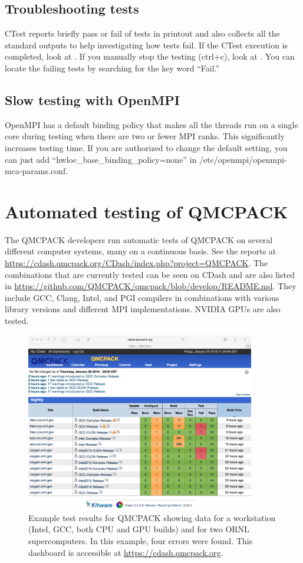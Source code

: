 \subsection{Troubleshooting tests}
CTest reports briefly pass or fail of tests in printout and also collects all the standard outputs to help investigating how tests fail.
If the CTest execution is completed, look at .
If you manually stop the testing (ctrl+c), look at .
You can locate the failing tests by searching for the key word ``Fail.''

\subsection{Slow testing with OpenMPI}
OpenMPI has a default binding policy that makes all the threads run on a single core during testing when there are two or fewer MPI ranks.
This significantly increases testing time. If you are authorized to change the default setting, you can just add ``hwloc\_base\_binding\_policy=none'' in /etc/openmpi/openmpi-mca-params.conf.

\section{Automated testing of QMCPACK}

The QMCPACK developers run automatic tests of QMCPACK on several
different computer systems,  many on a continuous basis. See the reports at
\url{https://cdash.qmcpack.org/CDash/index.php?project=QMCPACK}.
The combinations that are currently tested can be seen on CDash and are also listed in
\url{https://github.com/QMCPACK/qmcpack/blob/develop/README.md}. They include GCC, Clang, Intel, and PGI compilers in combinations
with various library versions and different MPI implementations. NVIDIA GPUs are also tested.

\begin{figure}
  \centering
  \includegraphics[width=10cm]{./figures/QMCPACK_CDash_CTest_Results_20160129.png}
  \caption{Example test results for QMCPACK showing data for a
    workstation (Intel, GCC, both CPU and GPU builds) and for two ORNL
    supercomputers. In this example, four errors were found. This
    dashboard is accessible at \url{https://cdash.qmcpack.org}.}
\end{figure}

